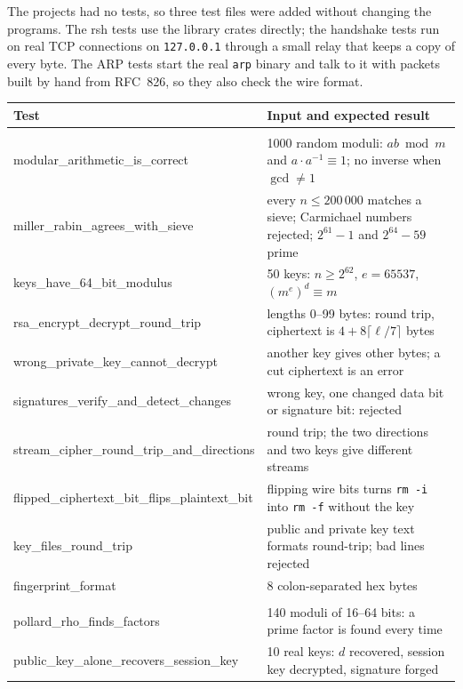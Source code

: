 \documentclass[11pt,a4paper]{article}
\begin{document}
The projects had no tests, so three test files were added without changing the
programs. The rsh tests use the library crates directly; the handshake tests run
on real TCP connections on \texttt{127.0.0.1} through a small relay that keeps a
copy of every byte. The ARP tests start the real \texttt{arp} binary and talk to
it with packets built by hand from RFC~826, so they also check the wire format.

\begin{table}[H]
\centering
\footnotesize
\begin{tabularx}{\textwidth}{@{}>{\ttfamily\scriptsize}l X@{}}
\toprule
\normalfont Test & Input and expected result \\
\midrule
\multicolumn{2}{@{}l}{\textit{rsh-crypto/tests/crypto.rs}} \\
modular\_arithmetic\_is\_correct & 1000 random moduli: $ab \bmod m$ and $a \cdot a^{-1} \equiv 1$; no inverse when $\gcd \ne 1$ \\
miller\_rabin\_agrees\_with\_sieve & every $n \le 200\,000$ matches a sieve; Carmichael numbers rejected; $2^{61}-1$ and $2^{64}-59$ prime \\
keys\_have\_64\_bit\_modulus & 50 keys: $n \ge 2^{62}$, $e = 65537$, $(m^{e})^{d} \equiv m$ \\
rsa\_encrypt\_decrypt\_round\_trip & lengths 0--99 bytes: round trip, ciphertext is $4 + 8\lceil \ell/7 \rceil$ bytes \\
wrong\_private\_key\_cannot\_decrypt & another key gives other bytes; a cut ciphertext is an error \\
signatures\_verify\_and\_detect\_changes & wrong key, one changed data bit or signature bit: rejected \\
stream\_cipher\_round\_trip\_and\_directions & round trip; the two directions and two keys give different streams \\
flipped\_ciphertext\_bit\_flips\_plaintext\_bit & flipping wire bits turns \texttt{rm -i} into \texttt{rm -f} without the key \\
key\_files\_round\_trip & public and private key text formats round-trip; bad lines rejected \\
fingerprint\_format & 8 colon-separated hex bytes \\
\multicolumn{2}{@{}l}{\textit{rsh-crypto/tests/attack.rs}} \\
pollard\_rho\_finds\_factors & 140 moduli of 16--64 bits: a prime factor is found every time \\
public\_key\_alone\_recovers\_session\_key & 10 real keys: $d$ recovered, session key decrypted, signature forged \\

\end{tabularx}
\end{table}
\end{document}
